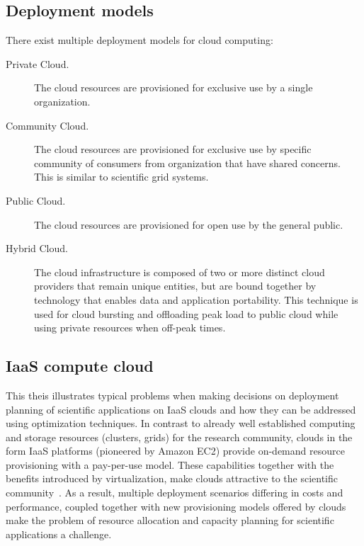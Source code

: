 \subsection{Deployment models}

There exist multiple deployment models for cloud computing:
\begin{description}
  \item[Private Cloud.] The cloud resources are provisioned for exclusive use by a single organization.
  \item[Community Cloud.] The cloud resources are provisioned for exclusive use by specific community of consumers from organization that have shared concerns. This is similar to scientific grid systems.
  \item[Public Cloud.] The cloud resources are provisioned for open use by the general public.
  \item[Hybrid Cloud.] The cloud infrastructure is composed of two or more distinct cloud providers that remain unique entities, but are bound together by technology that enables data and application portability. This technique is used for cloud bursting and offloading peak load to public cloud while using private resources when off-peak times.
\end{description}

\subsection{IaaS compute cloud}

This theis illustrates typical problems when making decisions on deployment
planning of scientific applications on IaaS clouds and how they can be addressed using optimization techniques. In contrast to already well established computing and storage resources (clusters, grids) for the research community, clouds in the form IaaS  platforms (pioneered by Amazon EC2) provide on-demand resource provisioning with a pay-per-use model. These capabilities together with the benefits introduced by virtualization, make clouds attractive to the scientific community~\cite{Deelman09}. As a result, multiple deployment scenarios differing in costs and performance, coupled together with new provisioning models offered by clouds make the problem of resource allocation and capacity planning for scientific applications a challenge.

